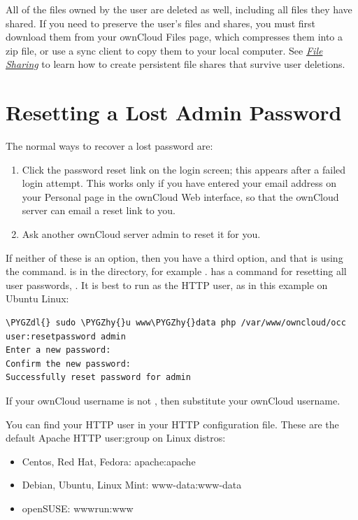 \documentclass[letterpaper,10pt,english]{sphinxmanual}
\def\PYGZdl{\char`\$}
\def\PYGZhy{\char`\-}
\begin{document}
All of the files owned by the user are deleted as well, including all files they
have shared. If you need to preserve the user's files and shares, you must first
download them from your ownCloud Files page, which compresses them into a zip
file, or use a sync client to copy them to your local computer. See
{\hyperref[configuration_files/file_sharing_configuration::doc]{\emph{File Sharing}}} to learn how to create
persistent file shares that survive user deletions.


\section{Resetting a Lost Admin Password}
\label{configuration_user/reset_admin_password::doc}\label{configuration_user/reset_admin_password:resetting-a-lost-admin-password}
The normal ways to recover a lost password are:
\begin{enumerate}
\item {} 
Click the password reset link on the login screen; this appears after a
failed login attempt. This works only if you have entered your email address
on your Personal page in the ownCloud Web interface, so that the ownCloud
server can email a reset link to you.

\item {} 
Ask another ownCloud server admin to reset it for you.

\end{enumerate}

If neither of these is an option, then you have a third option, and that is
using the  command.  is in the  directory, for
example .  has a command for resetting all
user passwords, . It is best to run  as the HTTP
user, as in this example on Ubuntu Linux:

\begin{Verbatim}[commandchars=\\\{\}]
\PYGZdl{} sudo \PYGZhy{}u www\PYGZhy{}data php /var/www/owncloud/occ user:resetpassword admin
Enter a new password:
Confirm the new password:
Successfully reset password for admin
\end{Verbatim}

If your ownCloud username is not , then substitute your ownCloud
username.

You can find your HTTP user in your HTTP configuration file. These are the
default Apache HTTP user:group on Linux distros:
\begin{itemize}
\item {} 
Centos, Red Hat, Fedora: apache:apache

\item {} 
Debian, Ubuntu, Linux Mint: www-data:www-data

\item {} 
openSUSE: wwwrun:www

\end{itemize}
\end{document}
